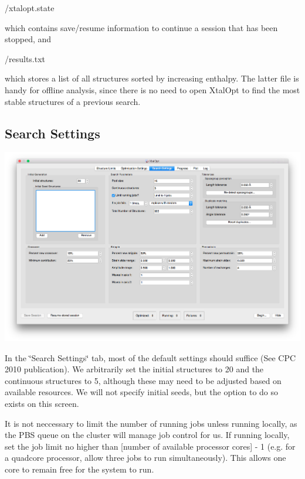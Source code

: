 \begin{DoxyCode}
/xtalopt.state
\end{DoxyCode}


which contains save/resume information to continue a session that has been stopped, and


\begin{DoxyCode}
/results.txt
\end{DoxyCode}


which stores a list of all structures sorted by increasing enthalpy. The latter file is handy for offline analysis, since there is no need to open Xtal\+Opt to find the most stable structures of a previous search.\hypertarget{tut-xo_search-set}{}\subsection{Search Settings}\label{tut-xo_search-set}
 
\begin{DoxyImageNoCaption}
  \mbox{\includegraphics[width=\textwidth]{search-set.png}}
\end{DoxyImageNoCaption}


In the \char`\"{}\+Search Settings\char`\"{} tab, most of the default settings should suffice (See C\+P\+C 2010 publication). We arbitrarily set the initial structures to 20 and the continuous structures to 5, although these may need to be adjusted based on available resources. We will not specify initial seeds, but the option to do so exists on this screen.

It is not neccessary to limit the number of running jobs unless running locally, as the P\+B\+S queue on the cluster will manage job control for us. If running locally, set the job limit no higher than \mbox{[}number of available processor cores\mbox{]} -\/ 1 (e.\+g. for a quadcore processor, allow three jobs to run simultaneously). This allows one core to remain free for the system to run.

